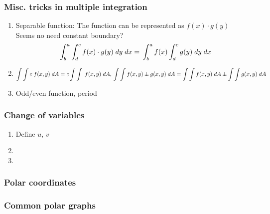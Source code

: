 \columnbreak

\subsubsection*{Misc. tricks in multiple integration}

\begin{mdframed}[style=theorem]
	\begin{enumerate}[label=(\Alph*)]
		\item Separable function: The function can be represented as $f(x) \cdot g(y)$ \\
		Seems no need constant boundary?
		$$\int^a_b\int^c_d f(x) \cdot g(y) \; dy \; dx = \\
		\int^a_b f(x) \int^c_d g(y) \; dy \; dx $$
		\item $\displaystyle \int \int c \; f(x, y) \; dA = c \int \int \; f(x, y) \; dA, \\
		\int \int f(x, y) \pm g(x, y) \; dA = \int \int f(x, y) \; dA \pm \int \int g(x, y) \; dA $
		\item Odd/even function, period
	\end{enumerate}
\end{mdframed}

\subsubsection*{Change of variables}

\begin{mdframed}[style=theorem]
	\begin{enumerate}
		\item Define $u$, $v$
		\item 
		\item
	\end{enumerate}
\end{mdframed}

\subsubsection*{Polar coordinates}

\begin{mdframed}[style=theorem]
\end{mdframed}

\subsubsection*{Common polar graphs}

\begin{mdframed}[style=theorem]
\end{mdframed}
